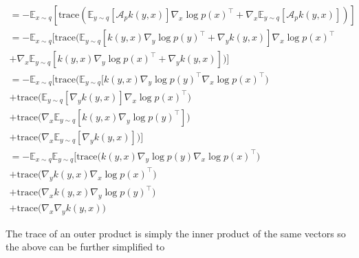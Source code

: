 \documentclass{article}
\begin{document}
    \begin{gather}
             =  - \mathbb{E}_{x \sim q} \left[ 
                     \text{trace} \left( \mathbb{E}_{y \sim q} \left[ \mathcal{A}_p k(y,x) \right] \nabla_x \log p(x)^\top
                            + \nabla_x \mathbb{E}_{y \sim q } \left[ \mathcal{A}_p k(y, x) \right] \right) 
                    \right] \\
            =  - \mathbb{E}_{x \sim q} \Big[ 
                         \text{trace}  \Big(
                          \mathbb{E}_{y\sim q} \left[ k(y,x) \nabla_y \log p(y)^\top 
                          + \nabla_{y} k(y,x) \right] \nabla_x \log p(x)^\top \\
                   + \nabla_x \mathbb{E}_{y \sim q } \left[ 
                              k(y,x) \nabla_y \log p(x)^\top 
                              + \nabla_{y} k(y,x)
                          \right] 
                  \Big) \Big] \\
            = - \mathbb{E}_{x \sim q} \Big[ 
                 \text{trace} \Big( \mathbb{E}_{y \sim q} [ k(y,x) \nabla_y \log p(y)^\top \nabla_x \log p(x)^\top \Big) \\
                 + \text{trace} \Big( \mathbb{E}_{y \sim q} [ \nabla_{y}  k(y,x) ] \nabla_x \log p(x)^\top \Big) \\
                 + \text{trace} \Big( \nabla_x \mathbb{E}_{y \sim q} [ k(y,x) \nabla_y  \log p(y)^\top ] \Big) \\
                 + \text{trace} \Big( \nabla_x \mathbb{E}_{y \sim q} [ \nabla_y  k(y,x)] \Big)
                 \Big] \\
             = - \mathbb{E}_{x \sim q} \mathbb{E}_{y \sim q} \Big[
                 \text{trace} \Big( k(y,x) \nabla_y \log p(y) \nabla_x \log p(x)^\top \Big) \\
                 + \text{trace} \Big( \nabla_y  k(y,x) \nabla_x \log p(x)^\top \Big) \\
                 + \text{trace} \Big( \nabla_x k(y,x) \nabla_y  \log p(y)^\top \Big) \\
                 + \text{trace} \Big( \nabla_x \nabla_y  k(y,x) \Big) 
    \end{gather}

    The trace of an outer product is simply the inner product of the same vectors so the above can 
    be further simplified to
\end{document}
